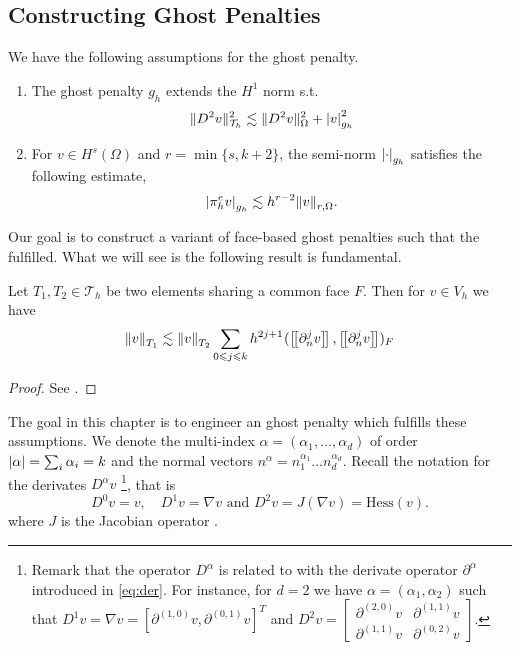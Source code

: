 
\newpage
\subsection{Constructing Ghost Penalties}%
\label{sec:constructing_ghost_penalties}

We have the following assumptions for the ghost penalty.
\begin{enumerate}[label=\textbf{EP\arabic*}]
    \item \label{as:EP1} The ghost penalty $g_{h}$ extends the $H^{1}$ norm s.t. \[
    \| D^2v \|_{ \mathcal{T} _{h} }^{ 2 }  \lesssim \| D^2 v \|_{ \Omega  }^{  2} + \left\lvert  v  \right\rvert _{g_{h}}^2
    \]
\item \label{as:EP2} For $v \in H^{s}( \Omega ) $ and $r = \min \{s,k+2 \} $, the semi-norm $\left\lvert  \cdot   \right\rvert_{g_{h}} $ satisfies the following estimate, \[
    \left\lvert  \pi _{h}^{e} v  \right\rvert _{g_{h}} \lesssim  h^{r-2} \| v \|_{ r,\Omega  }^{  }.
    \]
\end{enumerate}


Our goal is to construct a variant of face-based ghost penalties such that the fulfilled.
What we will see is the following result is fundamental.

\begin{lemma}
    Let $T_{1},T_{2 } \in  \mathcal{T} _{h}$ be two elements sharing a common face $F$. Then for $v \in V_{h}$  we have \[
    \| v \|_{ T_{1} }^{  }  \lesssim \| v \|_{ T_{2} }^{  } \sum_{0\leqslant j\leqslant k}  {h^{2j +1}}^{} ( \left[\!\left[  \partial _{n}^{j} v  \right]\!\right], \left[\!\left[  \partial ^{j}_{n} v  \right]\!\right]    )_{F}
    \]

\end{lemma}
\begin{proof}
    See \cite[Lemma 2.19]{gurkan2019stabilized}.
\end{proof}
The goal in this chapter is to engineer an ghost penalty which fulfills these assumptions.
We denote the multi-index $\alpha  = ( \alpha _{1}, \ldots, \alpha _{d})  $ of order $\left\lvert  \alpha   \right\rvert = \sum_{i}^{}  \alpha _{i} = k $   and the normal vectors $n^{\alpha } = n_{1}^{\alpha _{1}} \ldots n_{d}^{\alpha _{d}}$.
Recall the notation for the derivates $D^{\alpha } v$
\footnote{
Remark that the operator $D^{\alpha }$  is related to with the derivate operator $\partial ^{\alpha } $ introduced in \eqref{eq:der}. For instance, for $d=2$ we have $\alpha = ( \alpha _{1}, \alpha _{2}) $  such that $ D^{1} v =  \nabla v  = \left[ \partial ^{( 1,0 )} v,\partial ^{( 0,1 )}v
\right]^{T}$ and $   D^2 v  = \begin{bmatrix}
\partial ^{( 2,0 )} v &  \partial ^{( 1,1) }v \\
\partial ^{( 1,1 )} v &  \partial ^{( 0,2) }v
\end{bmatrix}
 $.
},
that is \[
D ^{0} v  = v, \quad   D ^{1}v  = \nabla v \text{ and }  D ^{2} v  = J(\nabla v) = \mathrm{Hess}(v).
\]
where $J$ is the Jacobian operator .

